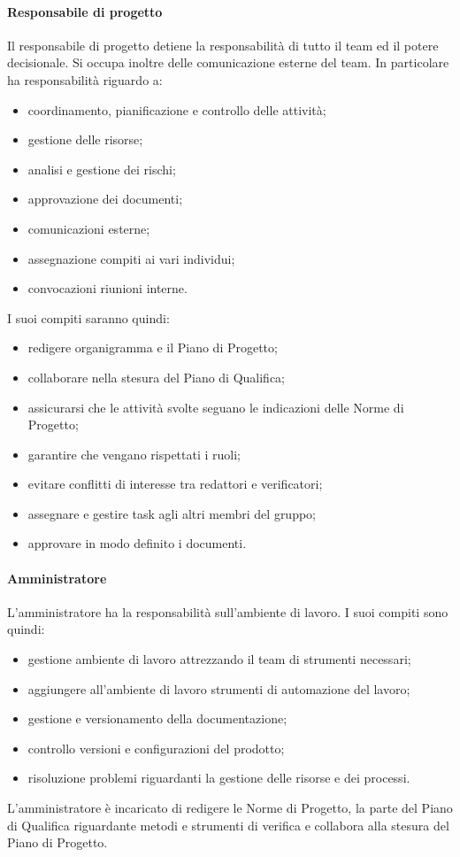 \paragraph{Responsabile di progetto}
Il responsabile di progetto detiene la responsabilità di tutto il team ed il potere decisionale. Si occupa inoltre delle comunicazione esterne del team.
In particolare ha responsabilità riguardo a:
\begin{itemize}
	\item coordinamento, pianificazione e controllo delle attività;
	\item gestione delle risorse;
	\item analisi e gestione dei rischi;
	\item approvazione dei documenti;
	\item comunicazioni esterne;
	\item assegnazione compiti ai vari individui;
	\item convocazioni riunioni interne.
\end{itemize}
I suoi compiti saranno quindi:
\begin{itemize}
	\item redigere organigramma e il Piano di Progetto;
	\item collaborare nella stesura del Piano di Qualifica;
	\item assicurarsi che le attività svolte seguano le indicazioni delle Norme di Progetto;
	\item garantire che vengano rispettati i ruoli;
	\item evitare conflitti di interesse tra redattori e verificatori;
	\item assegnare e gestire task agli altri membri del gruppo;
	\item approvare in modo definito i documenti.
\end{itemize}
\paragraph{Amministratore}
L'amministratore ha la responsabilità sull'ambiente di lavoro.
I suoi compiti sono quindi:
\begin{itemize}
	\item gestione ambiente di lavoro attrezzando il team di strumenti necessari;
	\item aggiungere all'ambiente di lavoro strumenti di automazione del lavoro;
	\item gestione e versionamento della documentazione;
	\item controllo versioni e configurazioni del prodotto;
	\item risoluzione problemi riguardanti la gestione delle risorse e dei processi.
\end{itemize}
L'amministratore è incaricato di redigere le Norme di Progetto, la parte del Piano di Qualifica riguardante metodi e strumenti di verifica e collabora alla stesura del Piano di Progetto.
